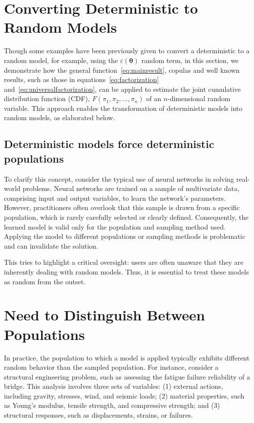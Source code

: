 \section{Converting Deterministic to Random Models}
Though some examples have been previously given to convert a deterministic to a random model, for example, using the $\varepsilon(\boldsymbol{\theta})$ random term, in this section, we demonstrate how the general function~\eqref{eq:mainresult}, copulas and well known results, such as those in equations~\eqref{eq:factorization} and~\eqref{eq:universalfactorization}, can be applied to estimate the joint cumulative distribution function (CDF), $F(\pi_1,\pi_2,\ldots,\pi_n)$ of an $n$-dimensional random variable. This approach enables the transformation of deterministic models into random models, as elaborated below.

\subsection{Deterministic models force deterministic populations}
To clarify this concept, consider the typical use of neural networks in solving real-world problems. Neural networks are trained on a sample of multivariate data, comprising input and output variables, to learn the network's parameters. However, practitioners often overlook that this sample is drawn from a specific population, which is rarely carefully selected or clearly defined. Consequently, the learned model is valid only for the population and sampling method used. Applying the model to different populations or sampling methods is problematic and can invalidate the solution.

This tries to highlight a critical oversight: users are often unaware that they are inherently dealing with random models. Thus, it is essential to treat these models as random from the outset.

\section{Need to Distinguish Between Populations}
In practice, the population to which a model is applied typically exhibits different random behavior than the sampled population. For instance, consider a structural engineering problem, such as assessing the fatigue failure reliability of a bridge. This analysis involves three sets of variables: (1) external actions, including gravity, stresses, wind, and seismic loads; (2) material properties, such as Young's modulus, tensile strength, and compressive strength; and (3) structural responses, such as displacements, strains, or failures.

